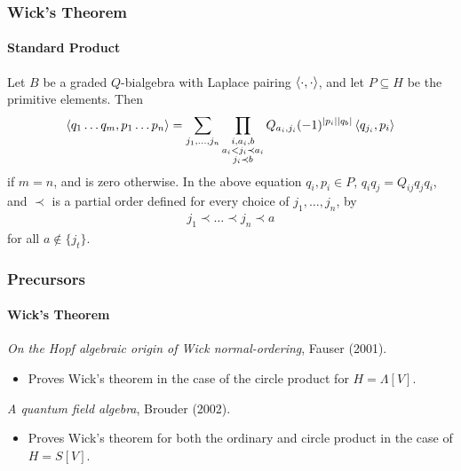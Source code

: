 \documentclass{beamer}
\begin{document}


\begin{frame}

\frametitle{Wick's Theorem}

\framesubtitle{Standard Product}

\begin{prop}{}{}
Let $B$ be a graded $Q$-bialgebra with Laplace pairing $\left\langle \cdot, \cdot \right\rangle$, and let $P \subseteq H$ be the primitive elements. Then
\begin{equation}
\left\langle q_1 \ldots q_m,p_1 \ldots p_n \right\rangle = 
\sum_{j_1, \ldots, j_n} \prod_{\substack{i,a_i,b \\ a_i < j_i \prec a_i \\
j_i \prec b}} Q_{a_i, j_i} (-1)^{| p_i | | q_b |}   \left\langle q_{j_i}, p_i \right\rangle
\end{equation}
if $m = n$, and is zero otherwise. In the above equation $q_i, p_i \in P$, $q_i q_j = Q_{ij} q_j q_i$, and $\prec$ is a partial order defined for every choice of $j_1, \ldots, j_n$, by
\begin{align*}
j_1 \prec \ldots \prec j_n \prec a
\end{align*}
for all $a \notin \{ j_t \}$.
\end{prop}

\end{frame}


\begin{frame}
\frametitle{Precursors}

\framesubtitle{Wick's Theorem}


\textit{On the Hopf algebraic origin of Wick normal-ordering}, Fauser (2001).
\begin{itemize}
\item Proves Wick's theorem in the case of the circle product for $H = \Lambda[V]$.
\end{itemize}

\bigskip

\textit{A quantum field algebra}, Brouder (2002).
\begin{itemize}
\item Proves Wick's theorem for both the ordinary and circle product in the case of $H = S[V]$.

\end{itemize}


\end{frame}
\end{document}
